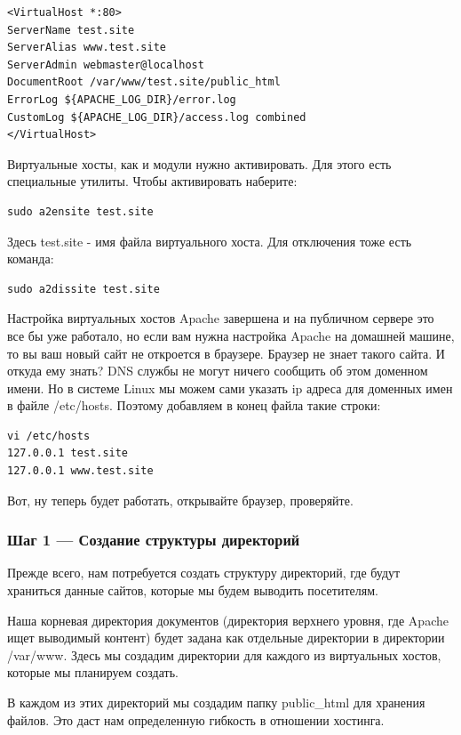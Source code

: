 \documentclass[14pt, a4paper]{article}
\begin{document}
\begin{lstlisting}
<VirtualHost *:80>
ServerName test.site
ServerAlias www.test.site
ServerAdmin webmaster@localhost
DocumentRoot /var/www/test.site/public_html
ErrorLog ${APACHE_LOG_DIR}/error.log
CustomLog ${APACHE_LOG_DIR}/access.log combined
</VirtualHost>
\end{lstlisting}

Виртуальные хосты, как и модули нужно активировать. Для этого есть специальные утилиты. Чтобы активировать наберите:
\begin{lstlisting}
sudo a2ensite test.site
\end{lstlisting}

Здесь test.site - имя файла виртуального хоста. Для отключения тоже есть команда:
\begin{lstlisting}
sudo a2dissite test.site
\end{lstlisting}

Настройка виртуальных хостов Apache завершена и на публичном сервере это все бы уже работало, но 
если вам нужна настройка Apache на домашней машине, то вы ваш новый сайт не откроется в браузере. 
Браузер не знает такого сайта. И откуда ему знать? DNS службы не могут ничего сообщить об этом 
доменном имени. Но в системе Linux мы можем сами указать ip адреса для доменных имен в файле 
/etc/hosts. Поэтому добавляем в конец файла такие строки:
\begin{lstlisting}
vi /etc/hosts
127.0.0.1 test.site
127.0.0.1 www.test.site
\end{lstlisting}

Вот, ну теперь будет работать, открывайте браузер, проверяйте.


\subsubsection*{Шаг 1 — Создание структуры директорий}
Прежде всего, нам потребуется создать структуру директорий, где будут храниться данные 
сайтов, которые мы будем выводить посетителям.

Наша корневая директория документов (директория верхнего уровня, где Apache ищет выводимый контент) 
будет задана как отдельные директории в директории /var/www. Здесь мы создадим директории для каждого 
из виртуальных хостов, которые мы планируем создать.

В каждом из этих директорий мы создадим папку public\_html для хранения файлов. 
Это даст нам определенную гибкость в отношении хостинга.
\end{document}
